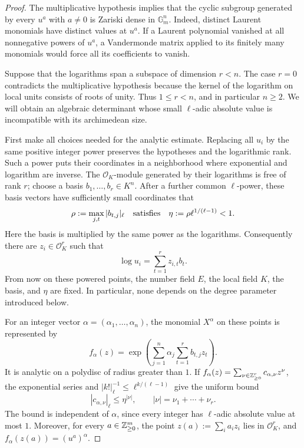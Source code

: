\begin{proof}
The multiplicative hypothesis implies that the cyclic subgroup
generated by every $u^a$ with $a\ne0$ is Zariski dense in
$\mathbb G_m^n$.  Indeed, distinct Laurent monomials have distinct
values at $u^a$.  If a Laurent polynomial vanished at all nonnegative
powers of $u^a$, a Vandermonde matrix applied to its finitely many
monomials would force all its coefficients to vanish.

Suppose that the logarithms span a subspace of dimension $r<n$.
The case $r=0$ contradicts the multiplicative hypothesis because the
kernel of the logarithm on local units consists of roots of unity.
Thus $1\leq r<n$, and in particular $n\geq2$.  We will obtain an
algebraic determinant whose small $\ell$-adic absolute value is
incompatible with its archimedean size.

First make all choices needed for the analytic estimate.  Replacing
all $u_i$ by the same positive integer power preserves the hypotheses
and the logarithmic rank.  Such a power puts their coordinates in a
neighborhood where exponential and logarithm are inverse.  The
$\mathcal O_K$-module generated by their logarithms is free of rank
$r$; choose a basis $b_1,\ldots,b_r\in K^n$.  After a further common
$\ell$-power, these basis vectors have sufficiently small coordinates
that
\[
 \rho:=\max_{j,t}|b_{t,j}|_\ell
 \quad\hbox{satisfies}\quad
 \eta:=\rho\ell^{1/(\ell-1)}<1.
\]
Here the basis is multiplied by the same power as the logarithms.
Consequently there are $z_i\in\mathcal O_K^r$ such that
\[
 \log u_i=\sum_{t=1}^r z_{i,t}b_t.
\]
From now on these powered points, the number field $E$, the local
field $K$, the basis, and $\eta$ are fixed.  In particular, none
depends on the degree parameter introduced below.

For an integer vector $\alpha=(\alpha_1,\ldots,\alpha_n)$, the
monomial $X^\alpha$ on these points is represented by
\[
 f_\alpha(z)=
 \exp\!\left(\sum_{j=1}^n\alpha_j
                      \sum_{t=1}^r b_{t,j}z_t\right).
\]
It is analytic on a polydisc of radius greater than $1$.  If
$f_\alpha(z)=\sum_{\nu\in\mathbb Z_{\geq0}^r}c_{\alpha,\nu}z^\nu$,
the exponential series and
$|k!|_\ell^{-1}\leq\ell^{k/(\ell-1)}$ give the uniform bound
\begin{equation}\label{eq:log-taylor-bound}
 |c_{\alpha,\nu}|_\ell\leq\eta^{|\nu|},
 \qquad |\nu|=\nu_1+\cdots+\nu_r.
\end{equation}
The bound is independent of $\alpha$, since every integer has
$\ell$-adic absolute value at most $1$.  Moreover, for every
$a\in\mathbb Z_{\geq0}^m$, the point
$z(a):=\sum_i a_i z_i$ lies in $\mathcal O_K^r$, and
$f_\alpha(z(a))=(u^a)^\alpha$.


\end{proof}
